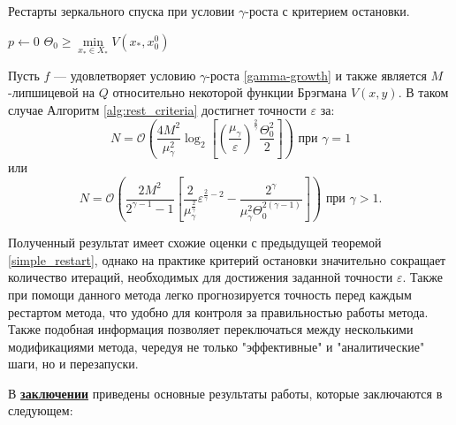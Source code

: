 \begin{algorithm}[htp]
    \caption{Рестарты зеркального спуска при условии $\gamma$-роста с критерием остановки.}
    \label{alg:rest_criteria}
    $p \gets 0$\;
    $\Theta_0 \geq \min\limits_{x_* \in X_*}{V(x_*,x_0^0)}$\;
\end{algorithm}
\begin{theorem} \label{restared_criteria}
    Пусть $f$ --- удовлетворяет условию $\gamma$-роста \eqref{gamma-growth} и также является $M$-липшицевой на $Q$ относительно некоторой функции Брэгмана $V(x, y)$. В таком случае Алгоритм \ref{alg:rest_criteria} достигнет точности $\varepsilon$ за:
    \begin{equation}
       N = \mathcal{O} \left( \frac{4 M^2}{\mu_{\gamma}^2} \log_2{\left[\left(\frac{\mu_{\gamma}}{\varepsilon}\right)^{\frac{2}{\gamma}} \frac{\Theta_0^2}{2}\right]}\right) \text{ при } \gamma = 1
   \end{equation}
   или
   \begin{equation}
       N = \mathcal{O}\left( \frac{2 M^2 }{2^{\gamma - 1} - 1}\left[ \frac{2}{\mu_{\gamma}^{\frac{2}{\gamma}}}\varepsilon^{\frac{2}{\gamma} - 2} - \frac{2^{\gamma}}{\mu_{\gamma}^2 \Theta_0^{2(\gamma - 1)}} \right] \right) \text{ при } \gamma > 1.
   \end{equation}
\end{theorem}

 Полученный результат имеет схожие оценки с предыдущей теоремой \ref{simple_restart}, однако на практике критерий остановки значительно сокращает количество итераций, необходимых для достижения заданной точности $\varepsilon$. Также при помощи данного метода легко прогнозируется точность перед каждым рестартом метода, что удобно для контроля за правильностью работы метода. Также подобная информация позволяет переключаться между несколькими модификациями метода, чередуя не только "эффективные" и "аналитические" шаги, но и перезапуски.  

\FloatBarrier
{}                                  %
В \underline{\textbf{заключении}} приведены основные результаты работы, которые заключаются в следующем:


